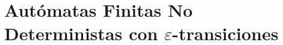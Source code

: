 \section{Autómatas Finitas No Deterministas con \texorpdfstring{$\varepsilon$-transiciones}{ε-transiciones}}



